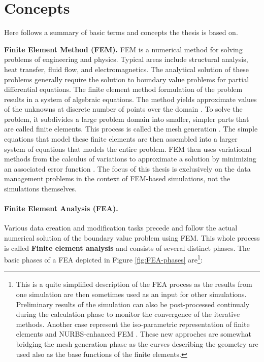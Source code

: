 \section{Concepts}

Here follows a summary of basic terms and concepts the thesis is based on.

\textbf{Finite Element Method (FEM).} FEM is a numerical method for solving problems of engineering and physics. Typical areas include structural analysis, heat transfer, fluid flow, and electromagnetics. The analytical solution of these problems generally require the solution to boundary value problems for partial differential equations. The finite element method formulation of the problem results in a system of algebraic equations. The method yields approximate values of the unknowns at discrete number of points over the domain \cite{XXX}. To solve the problem, it subdivides a large problem domain into smaller, simpler parts that are called finite elements. This process is called the mesh generation \cite{XXX}. The simple equations that model these finite elements are then assembled into a larger system of equations that models the entire problem. FEM then uses variational methods from the calculus of variations to approximate a solution by minimizing an associated error function \cite{XXX}. The focus of this thesis is exclusively on the data management problems in the context of FEM-based simulations, not the simulations themselves.


\paragraph{Finite Element Analysis (FEA).} Various data creation and modification tasks precede and follow the actual numerical solution of the boundary value problem using FEM. This whole process is called \textbf{Finite element analysis} and consists of several distinct phases. The basic phases of a FEA depicted in Figure \ref{fig:FEA-phases} are\footnote{This is a quite simplified description of the FEA process as the results from one simulation are then sometimes used as an input for other simulations. Preliminary results of the simulation can also be post-processed continualy during the calculation phase to monitor the convergence of the iterative methods. Another case represent the iso-parametric representation of finite elements \cite{XXX} and NURBS-enhanced FEM \cite{XXX}. These new approches are somewhat bridging the mesh generation phase as the curves describing the geometry are used also as the base functions of the finite elements.}:

